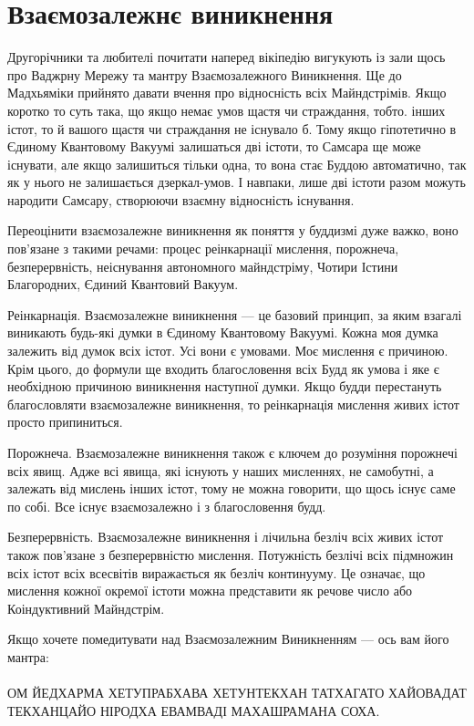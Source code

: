 \section{Взаємозалежнє виникнення}

Другорічники та любителі почитати наперед вікіпедію вигукують із
зали щось про Ваджрну Мережу та мантру Взаємозалежного Виникнення.
Ще до Мадхьяміки прийнято давати вчення про відносність всіх Майндстрімів.
Якщо коротко то суть така, що якщо немає умов щастя чи страждання,
тобто. інших істот, то й вашого щастя чи страждання не існувало б.
Тому якщо гіпотетично в Єдиному Квантовому Вакуумі залишаться дві істоти,
то Самсара ще може існувати, але якщо залишиться тільки одна, то вона
стає Буддою автоматично, так як у нього не залишається дзеркал-умов.
І навпаки, лише дві істоти разом можуть народити Самсару,
створюючи взаємну відносність існування.

Переоцінити взаємозалежне виникнення як поняття у буддизмі дуже важко,
воно пов'язане з такими речами: процес реінкарнації мислення, порожнеча,
безперервність, неіснування автономного майндстріму, Чотири Істини Благородних,
Єдиний Квантовий Вакуум.

Реінкарнація. Взаємозалежне виникнення --- це базовий принцип,
за яким взагалі виникають будь-які думки в Єдиному Квантовому Вакуумі.
Кожна моя думка залежить від думок всіх істот. Усі вони є умовами.
Моє мислення є причиною. Крім цього, до формули ще входить благословення
всіх Будд як умова і яке є необхідною причиною виникнення наступної думки.
Якщо будди перестануть благословляти взаємозалежне виникнення, то
реінкарнація мислення живих істот просто припиниться.

Порожнеча. Взаємозалежне виникнення також є ключем до розуміння порожнечі
всіх явищ. Адже всі явища, які існують у наших мисленнях, не самобутні,
а залежать від мислень інших істот, тому не можна говорити, що щось існує
саме по собі. Все існує взаємозалежно і з благословення будд.

Безперервність. Взаємозалежне виникнення і лічильна безліч всіх живих
істот також пов'язане з безперервністю мислення. Потужність безлічі всіх
підмножин всіх істот всіх всесвітів виражається як безліч континууму.
Це означає, що мислення кожної окремої істоти можна представити як речове
число або Коіндуктивний Майндстрім.

Якщо хочете помедитувати над Взаємозалежним Виникненням — ось вам його мантра:
\\
\\
ОМ ЙЕДХАРМА ХЕТУПРАБХАВА ХЕТУНТЕКХАН ТАТХАГАТО ХАЙОВАДАТ ТЕКХАНЦАЙО НІРОДХА ЕВАМВАДІ МАХАШРАМАНА СОХА.

